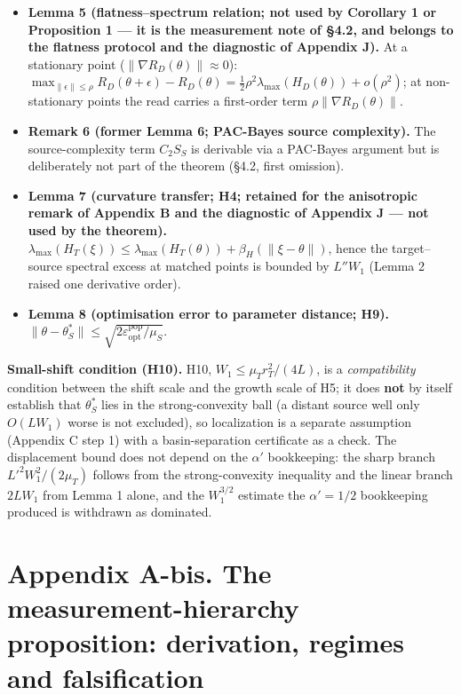 \documentclass[pdflatex,sn-mathphys-ay]{sn-jnl}
\begin{document}
\begin{itemize}
\item \textbf{Lemma 5 (flatness--spectrum relation; not used by Corollary 1 or Proposition 1 --- it is the measurement note of \S{}4.2, and belongs to the flatness protocol and the diagnostic of Appendix J).} At a stationary point ($\|\nabla R_D(\theta)\|\approx0$): $\max_{\|\epsilon\|\le\rho} R_D(\theta+\epsilon)-R_D(\theta) = \tfrac12\rho^2\lambda_{\max}(H_D(\theta)) + o(\rho^2)$; at non-stationary points the read carries a first-order term $\rho\|\nabla R_D(\theta)\|$.
\item \textbf{Remark 6 (former Lemma 6; PAC-Bayes source complexity).} The source-complexity term $C_2S_S$ is derivable via a PAC-Bayes argument but is deliberately not part of the theorem (\S{}4.2, first omission).
\item \textbf{Lemma 7 (curvature transfer; H4; retained for the anisotropic remark of Appendix B and the diagnostic of Appendix J --- not used by the theorem).} $\lambda_{\max}(H_T(\xi)) \le \lambda_{\max}(H_T(\theta)) + \beta_H(\|\xi-\theta\|)$, hence the target--source spectral excess at matched points is bounded by $L''W_1$ (Lemma 2 raised one derivative order).
\item \textbf{Lemma 8 (optimisation error to parameter distance; H9).} $\|\theta-\theta^*_S\| \le \sqrt{2\varepsilon^{\mathrm{pop}}_{\mathrm{opt}}/\mu_S}$.
\end{itemize}

\textbf{Small-shift condition (H10).} H10, $W_1\le\mu_T r_T^2/(4L)$, is a \emph{compatibility} condition between the shift scale and the growth scale of H5; it does \textbf{not} by itself establish that $\theta^*_S$ lies in the strong-convexity ball (a distant source well only $O(LW_1)$ worse is not excluded), so localization is a separate assumption (Appendix C step 1) with a basin-separation certificate as a check. The displacement bound does not depend on the $\alpha'$ bookkeeping: the sharp branch $L'^2W_1^2/(2\mu_T)$ follows from the strong-convexity inequality and the linear branch $2LW_1$ from Lemma 1 alone, and the $W_1^{3/2}$ estimate the $\alpha'=1/2$ bookkeeping produced is withdrawn as dominated.

\section*{Appendix A-bis. The measurement-hierarchy proposition: derivation, regimes and falsification}
\end{document}
